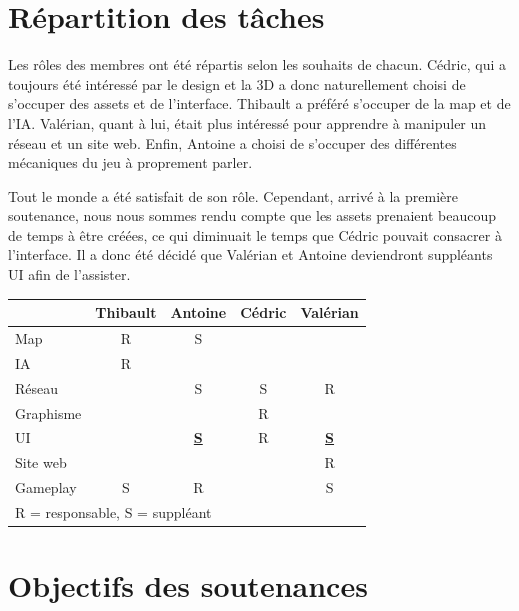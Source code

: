 \documentclass[12pt]{report}
\begin{document}
\section{Répartition des tâches}

Les rôles des membres ont été répartis selon les souhaits de chacun. Cédric, qui
a toujours été intéressé par le design et la 3D a donc naturellement choisi de
s'occuper des assets et de l'interface. Thibault a préféré s'occuper de la map
et de l'IA. Valérian, quant à lui, était plus intéressé pour apprendre à
manipuler un réseau et un site web. Enfin, Antoine a choisi de s'occuper des
différentes mécaniques du jeu à proprement parler.

Tout le monde a été satisfait de son rôle. Cependant, arrivé à la première
soutenance, nous nous sommes rendu compte que les assets prenaient beaucoup de
temps à être créées, ce qui diminuait le temps que Cédric pouvait consacrer à
l'interface. Il a donc été décidé que Valérian et Antoine deviendront suppléants
UI afin de l'assister.

\vspace{1cm}

\begin{center}
    \begin{tabular}{@{} l *4c @{}}
        \toprule
        \multicolumn{1}{c}{}    & \textbf{Thibault}  & \textbf{Antoine}  & \textbf{Cédric} & \textbf{Valérian} \\ 
        \midrule
        Map & R & S & & \\
        IA & R & & & \\
        Réseau & & S & S & R \\
        Graphisme & & & R & \\
        UI & & \underline{\textbf S} & R & \underline{\textbf S} \\
        Site web & & & & R \\
        Gameplay & S & R & & S\\
        \bottomrule
        \multicolumn{4}{l}{\footnotesize R = responsable, S = suppléant}\\
    \end{tabular}
\end{center}

\newpage

\section{Objectifs des soutenances}
\end{document}
